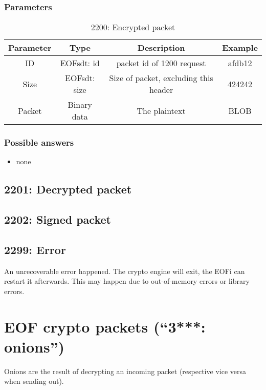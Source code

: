 \documentclass[12pt,a4paper]{book}
\begin{document}
\subsubsection{Parameters}
\begin{longtable}{|c|c|c|c|}
\caption{2200: Encrypted packet}\\
\hline
\textbf{Parameter} & \textbf{Type} & \textbf{Description} & \textbf{Example}\\
\hline
ID & EOFsdt: id & packet id of 1200 request & afdb12\\
\hline
Size & EOFsdt: size & Size of packet, excluding this header & 424242\\
\hline
Packet & Binary data & The plaintext & BLOB\\
\hline
\end{longtable}

\subsubsection{Possible answers}
\begin{itemize}
\item none
\end{itemize}
\subsection{2201: Decrypted packet}
\subsection{2202: Signed packet}
\subsection{2299: Error}
An unrecoverable error happened. The crypto engine will exit, the EOFi
can restart it afterwards. This may happen due to out-of-memory errors or
library errors.
\section{EOF crypto packets ("`3***: onions"')}
Onions are the result of decrypting an incoming packet (respective vice versa
when sending out).
\end{document}
